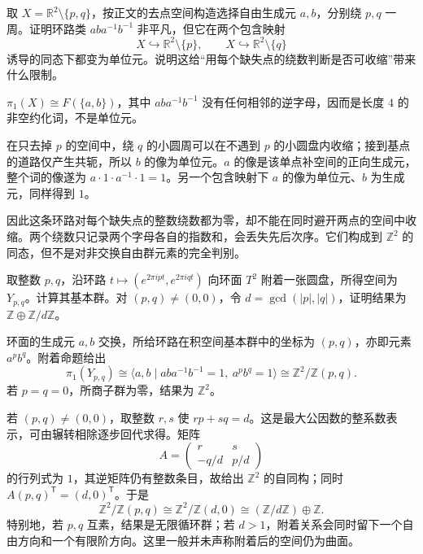 \begin{exercise}\label{g1:ex:puncture-commutator}
	取 \(X=\mathbb R^2\setminus\{p,q\}\)，按正文的去点空间构造选择自由生成元 \(a,b\)，分别绕 \(p,q\) 一周。证明环路类 \(aba^{-1}b^{-1}\) 非平凡，但它在两个包含映射
	\[
		X\hookrightarrow\mathbb R^2\setminus\{p\},\qquad
		X\hookrightarrow\mathbb R^2\setminus\{q\}
	\]
	诱导的同态下都变为单位元。说明这给“用每个缺失点的绕数判断是否可收缩”带来什么限制。
\end{exercise}
\begin{solution}
	\(\pi_1(X)\cong F(\{a,b\})\)，其中 \(aba^{-1}b^{-1}\) 没有任何相邻的逆字母，因而是长度 \(4\) 的非空约化词，不是单位元。

	在只去掉 \(p\) 的空间中，绕 \(q\) 的小圆周可以在不遇到 \(p\) 的小圆盘内收缩；接到基点的道路仅产生共轭，所以 \(b\) 的像为单位元。\(a\) 的像是该单点补空间的正向生成元，整个词的像遂为 \(a\cdot1\cdot a^{-1}\cdot1=1\)。另一个包含映射下 \(a\) 的像为单位元、\(b\) 为生成元，同样得到 \(1\)。

	因此这条环路对每个缺失点的整数绕数都为零，却不能在同时避开两点的空间中收缩。两个绕数只记录两个字母各自的指数和，会丢失先后次序。它们构成到 \(\mathbb Z^2\) 的同态，但不是对非交换自由群元素的完全判别。
\end{solution}

\begin{exercise}\label{g1:ex:torus-slope-attachment}
	取整数 \(p,q\)，沿环路 \(t\mapsto(e^{2\pi ipt},e^{2\pi iqt})\) 向环面 \(T^2\) 附着一张圆盘，所得空间为 \(Y_{p,q}\)。计算其基本群。对 \((p,q)\ne(0,0)\)，令 \(d=\gcd(|p|,|q|)\)，证明结果为 \(\mathbb Z\oplus\mathbb Z/d\mathbb Z\)。
\end{exercise}
\begin{solution}
	环面的生成元 \(a,b\) 交换，所给环路在积空间基本群中的坐标为 \((p,q)\)，亦即元素 \(a^pb^q\)。附着命题给出
	\[
		\pi_1(Y_{p,q})\cong
		\langle a,b\mid aba^{-1}b^{-1}=1,\ a^pb^q=1\rangle
		\cong\mathbb Z^2/\mathbb Z(p,q).
	\]
	若 \(p=q=0\)，所商子群为零，结果为 \(\mathbb Z^2\)。

	若 \((p,q)\ne(0,0)\)，取整数 \(r,s\) 使 \(rp+sq=d\)。这是最大公因数的整系数表示，可由辗转相除逐步回代求得。矩阵
	\[
		A=\begin{pmatrix}r&s\\-q/d&p/d\end{pmatrix}
	\]
	的行列式为 \(1\)，其逆矩阵仍有整数条目，故给出 \(\mathbb Z^2\) 的自同构；同时 \(A(p,q)^{\mathsf T}=(d,0)^{\mathsf T}\)。于是
	\[
		\mathbb Z^2/\mathbb Z(p,q)
		\cong\mathbb Z^2/\mathbb Z(d,0)
		\cong(\mathbb Z/d\mathbb Z)\oplus\mathbb Z.
	\]
	特别地，若 \(p,q\) 互素，结果是无限循环群；若 \(d>1\)，附着关系会同时留下一个自由方向和一个有限阶方向。这里一般并未声称附着后的空间仍为曲面。
\end{solution}

